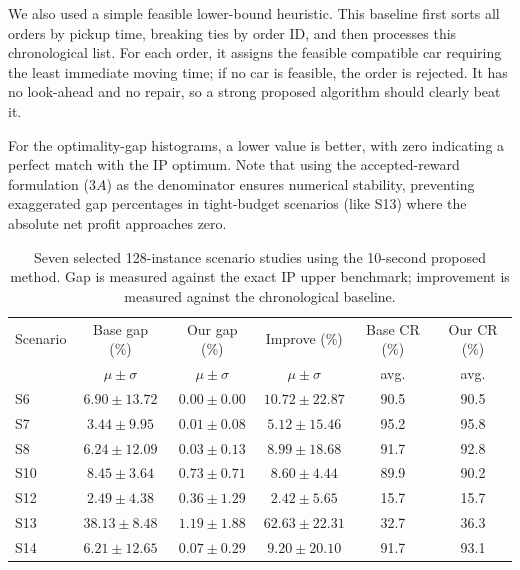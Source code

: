 \documentclass[10pt,a4paper]{article}
\begin{document}
We also used a simple feasible lower-bound heuristic.  This baseline first sorts
all orders by pickup time, breaking ties by order ID, and then processes this
chronological list.  For each order, it assigns the feasible compatible car
requiring the least immediate moving time; if no car is feasible, the order is
rejected.  It has no look-ahead and no repair, so a strong proposed algorithm
should clearly beat it.

For the optimality-gap histograms, a lower value is better, with zero indicating a perfect match with the IP optimum. Note that using the accepted-reward formulation ($3A$) as the denominator ensures numerical stability, preventing exaggerated gap percentages in tight-budget scenarios (like S13) where the absolute net profit approaches zero.

\begin{table}[htbp]
\centering
\small
\setlength{\tabcolsep}{3pt}
\caption{Seven selected 128-instance scenario studies using the 10-second proposed method. Gap is measured against the exact IP upper benchmark; improvement is measured against the chronological baseline.}
\label{tab:bench_selected}
\begin{tabular}{lccc|cc}
\toprule
Scenario & Base gap (\%) & Our gap (\%) & Improve (\%) & Base CR (\%) & Our CR (\%)\\
& $\mu \pm \sigma$ & $\mu \pm \sigma$ & $\mu \pm \sigma$ & avg. & avg.\\
\midrule
S6  & $6.90 \pm 13.72$ & $0.00 \pm 0.00$ & $10.72 \pm 22.87$ & 90.5 & 90.5\\
S7  & $3.44 \pm 9.95$ & $0.01 \pm 0.08$ & $5.12 \pm 15.46$ & 95.2 & 95.8\\
S8  & $6.24 \pm 12.09$ & $0.03 \pm 0.13$ & $8.99 \pm 18.68$ & 91.7 & 92.8\\
S10 & $8.45 \pm 3.64$ & $0.73 \pm 0.71$ & $8.60 \pm 4.44$ & 89.9 & 90.2\\
S12 & $2.49 \pm 4.38$ & $0.36 \pm 1.29$ & $2.42 \pm 5.65$ & 15.7 & 15.7\\
S13 & $38.13 \pm 8.48$ & $1.19 \pm 1.88$ & $62.63 \pm 22.31$ & 32.7 & 36.3\\
S14 & $6.21 \pm 12.65$ & $0.07 \pm 0.29$ & $9.20 \pm 20.10$ & 91.7 & 93.1\\
\bottomrule
\end{tabular}
\end{table}
\end{document}

